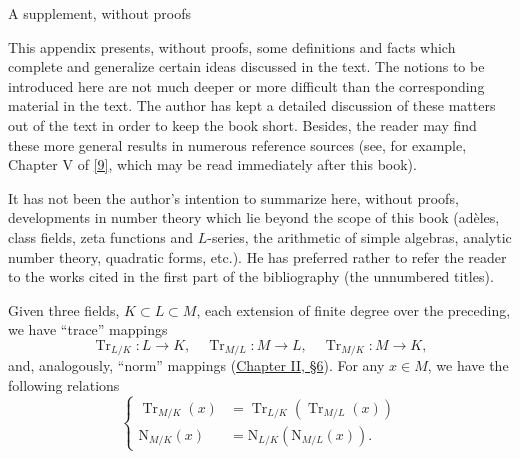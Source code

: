 \clearpage
{}%
\global\let\currentseccode\empty
\global\let\pagefirstsec\empty
\setcounter{equation}{0}%
\renewcommand{\chaptertitle}{}%
\def\currentsectitle{}%
\thispagestyle{emptyhead}%
{}%
\label{fm:supplement}%
%
\begin{center}{\Large A supplement, without proofs}\end{center}%
\vspace{1.2\baselineskip}%
\par

This appendix presents, without proofs, some definitions and facts which
complete and generalize certain ideas discussed in the text. The notions to
be introduced here are not much deeper or more difficult than the
corresponding material in the text. The author has kept a detailed
discussion of these matters out of the text in order to keep the book short.
Besides, the reader may find these more general results in numerous
reference sources (see, for example, Chapter V of \hyperref[bib:9]{[9]}, which may be read
immediately after this book).

It has not been the author's intention to summarize here, without proofs,
developments in number theory which lie beyond the scope of this book
(adèles, class fields, zeta functions and $L$-series, the arithmetic of
simple algebras, analytic number theory, quadratic forms, etc.). He has
preferred rather to refer the reader to the works cited in the first part of
the bibliography (the unnumbered titles).


Given three fields, $K\subset L\subset M$, each extension of finite degree
over the preceding, we have ``trace'' mappings
\[
\operatorname{Tr}_{L/K}:L\to K,\quad
\operatorname{Tr}_{M/L}:M\to L,\quad
\operatorname{Tr}_{M/K}:M\to K,
\]
and, analogously, ``norm'' mappings (\hyperref[sec:2.6]{Chapter II, §6}). For any $x\in M$, we
have the following relations
\begin{equation}
\left\{
\begin{aligned}
\operatorname{Tr}_{M/K}(x)&=\operatorname{Tr}_{L/K}
(\operatorname{Tr}_{M/L}(x))\\
\mathrm{N}_{M/K}(x)&=\mathrm{N}_{L/K}(\mathrm{N}_{M/L}(x)).
\end{aligned}
\right.
\label{eq:Supp.1}
\end{equation}

